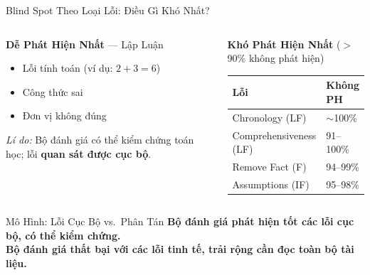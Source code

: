 \documentclass[aspectratio=169,10pt]{beamer}
\newcommand{\good}[1]{\textcolor{green!60!black}{\textbf{#1}}}
\newcommand{\bad}[1]{\textcolor{aclred}{\textbf{#1}}}
\begin{document}
\begin{frame}{Blind Spot Theo Loại Lỗi: Điều Gì Khó Nhất?}
  \begin{columns}[T]
      \begin{block}{\good{Dễ Phát Hiện Nhất} — Lập Luận}
        \begin{itemize}
          \item Lỗi tính toán (ví dụ: $2+3=6$)
          \item Công thức sai
          \item Đơn vị không đúng
        \end{itemize}
        \textit{Lí do:} Bộ đánh giá có thể kiểm chứng toán học; lỗi \textbf{quan sát được cục bộ}.
      \end{block}

      \begin{alertblock}{\bad{Khó Phát Hiện Nhất} ($>$90\% không phát hiện)}
        \begin{tabular}{lp{3.5cm}}
          \toprule
          \textbf{Lỗi} & \textbf{Không PH} \\
          \midrule
          Chronology (LF)        & $\sim$100\% \\
          Comprehensiveness (LF) & 91–100\% \\
          Remove Fact (F)        & 94–99\% \\
          Assumptions (IF)       & 95–98\% \\
          \bottomrule
        \end{tabular}
      \end{alertblock}
  \end{columns}

  \vspace{0.5em}
  \begin{block}{Mô Hình: Lỗi Cục Bộ vs.\ Phân Tán}
    \centering
    \textbf{Bộ đánh giá phát hiện tốt các lỗi \good{cục bộ, có thể kiểm chứng}.}\\
    \textbf{Bộ đánh giá thất bại với các lỗi \bad{tinh tế, trải rộng} cần đọc toàn bộ tài liệu.}
  \end{block}
\end{frame}
\end{document}
